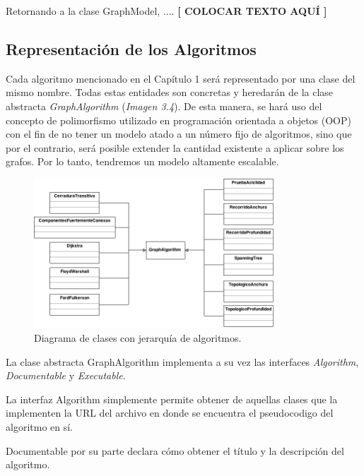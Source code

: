 \documentclass{book}
\begin{document}
Retornando a la clase GraphModel, .... \textbf{[ COLOCAR TEXTO AQUÍ ]}
\bigskip



\subsection{Representación de los Algoritmos}

Cada algoritmo mencionado en el Capítulo 1 será representado por una clase del mismo nombre. Todas estas entidades son concretas y heredarán de la clase abstracta \textit{GraphAlgorithm} (\textit{Imagen 3.4}). De esta manera, se hará uso del concepto de polimorfismo utilizado en programación orientada a objetos (OOP) con el fin de no tener un modelo atado a un número fijo de algoritmos, sino que por el contrario, será posible extender la cantidad existente a aplicar sobre los grafos. Por lo tanto, tendremos un modelo altamente escalable.
\bigskip


\begin{figure}[H]
	\centering
	\includegraphics[width=0.8\textwidth]{images/01-04.png}
	\medskip
	\caption{Diagrama de clases con jerarquía de algoritmos.}
	\medskip
\end{figure}
\bigskip

La clase abstracta GraphAlgorithm implementa a su vez las interfaces \textit{Algorithm}, \textit{Documentable} y \textit{Executable}. 
\par
La interfaz Algorithm simplemente permite obtener de aquellas clases que la implementen la URL del archivo en donde se encuentra el pseudocodigo del algoritmo en sí.
\par
Documentable por su parte declara cómo obtener el título y la descripción del algoritmo.
\bigskip
\end{document}
